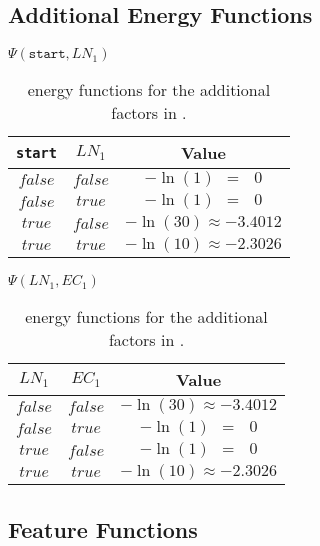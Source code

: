 \subsection{Additional Energy Functions}\label{app:subsec-lccrf-additional-energy-functions}
\begin{table}[H]
\begin{minipage}{0.5\linewidth}
\centering
$\Psi(\texttt{start},LN_1)$\par
\smallskip
\begin{tabular}{c c c}
 \toprule
 \texttt{start} & $LN_1$ & Value \\
 \midrule
 $false$ & $false$ & $-\ln(1)\ \ =\ \ \ 0$ \\
 $false$ & $true$ & $-\ln(1)\ \ =\ \ \ 0$ \\
 $true$ & $false$ & $-\ln(30)\approx-3.4012$ \\
 $true$ & $true$ & $-\ln(10)\approx-2.3026$ \\
 \bottomrule
\end{tabular}
\end{minipage}
\hfill
\begin{minipage}{0.5\linewidth}
\centering
$\Psi(LN_1,EC_1)$\par
\smallskip
\begin{tabular}{c c c}
 \toprule
 $LN_1$ & $EC_1$ & Value \\
 \midrule
 $false$ & $false$ & $-\ln(30)\approx-3.4012$ \\
 $false$ & $true$ & $-\ln(1)\ \ =\ \ \ 0$ \\
 $true$ & $false$ & $-\ln(1)\ \ =\ \ \ 0$ \\
 $true$ & $true$ & $-\ln(10)\approx-2.3026$ \\
 \bottomrule
\end{tabular}
\end{minipage}
\caption{\Glspl{energy function} for the additional \glspl{factor} in .}
\label{tab:example-linear-chain-crf-energy-functions}
\end{table}

\subsection{Feature Functions}\label{app:subsec-lccrf-feature-functions}


